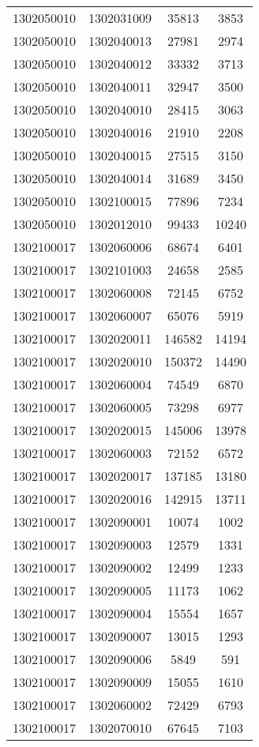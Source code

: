 \begin{longtable}{llcc}
1302050010 & 1302031009 & 35813 & 3853\\
1302050010 & 1302040013 & 27981 & 2974\\
1302050010 & 1302040012 & 33332 & 3713\\
1302050010 & 1302040011 & 32947 & 3500\\
1302050010 & 1302040010 & 28415 & 3063\\
1302050010 & 1302040016 & 21910 & 2208\\
1302050010 & 1302040015 & 27515 & 3150\\
1302050010 & 1302040014 & 31689 & 3450\\
1302050010 & 1302100015 & 77896 & 7234\\
1302050010 & 1302012010 & 99433 & 10240\\
1302100017 & 1302060006 & 68674 & 6401\\
1302100017 & 1302101003 & 24658 & 2585\\
1302100017 & 1302060008 & 72145 & 6752\\
1302100017 & 1302060007 & 65076 & 5919\\
1302100017 & 1302020011 & 146582 & 14194\\
1302100017 & 1302020010 & 150372 & 14490\\
1302100017 & 1302060004 & 74549 & 6870\\
1302100017 & 1302060005 & 73298 & 6977\\
1302100017 & 1302020015 & 145006 & 13978\\
1302100017 & 1302060003 & 72152 & 6572\\
1302100017 & 1302020017 & 137185 & 13180\\
1302100017 & 1302020016 & 142915 & 13711\\
1302100017 & 1302090001 & 10074 & 1002\\
1302100017 & 1302090003 & 12579 & 1331\\
1302100017 & 1302090002 & 12499 & 1233\\
1302100017 & 1302090005 & 11173 & 1062\\
1302100017 & 1302090004 & 15554 & 1657\\
1302100017 & 1302090007 & 13015 & 1293\\
1302100017 & 1302090006 & 5849 & 591\\
1302100017 & 1302090009 & 15055 & 1610\\
1302100017 & 1302060002 & 72429 & 6793\\
1302100017 & 1302070010 & 67645 & 7103\\

\end{longtable}
